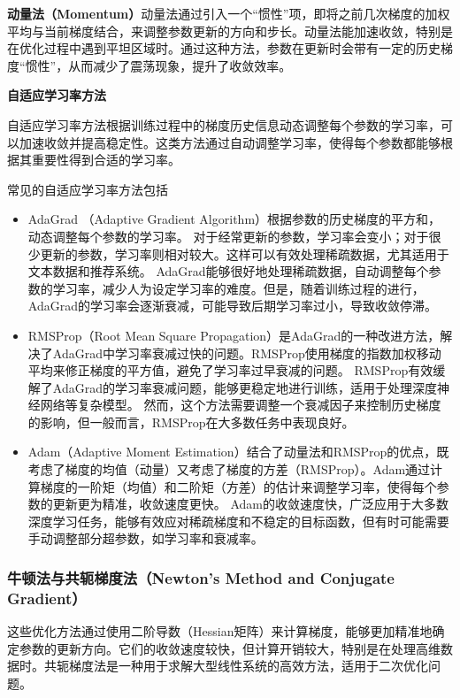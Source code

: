 {\bf 动量法（Momentum）}动量法通过引入一个“惯性”项，即将之前几次梯度的加权平均与当前梯度结合，来调整参数更新的方向和步长。动量法能加速收敛，特别是在优化过程中遇到平坦区域时。通过这种方法，参数在更新时会带有一定的历史梯度“惯性”，从而减少了震荡现象，提升了收敛效率。
 
{\bf 自适应学习率方法}
 
自适应学习率方法根据训练过程中的梯度历史信息动态调整每个参数的学习率，可以加速收敛并提高稳定性。这类方法通过自动调整学习率，使得每个参数都能够根据其重要性得到合适的学习率。

常见的自适应学习率方法包括 
 \begin{itemize} 
\item AdaGrad （Adaptive Gradient Algorithm）根据参数的历史梯度的平方和，动态调整每个参数的学习率。 对于经常更新的参数，学习率会变小；对于很少更新的参数，学习率则相对较大。这样可以有效处理稀疏数据，尤其适用于文本数据和推荐系统。
AdaGrad能够很好地处理稀疏数据，自动调整每个参数的学习率，减少人为设定学习率的难度。但是，随着训练过程的进行，AdaGrad的学习率会逐渐衰减，可能导致后期学习率过小，导致收敛停滞。

\item RMSProp（Root Mean Square Propagation）是AdaGrad的一种改进方法，解决了AdaGrad中学习率衰减过快的问题。RMSProp使用梯度的指数加权移动平均来修正梯度的平方值，避免了学习率过早衰减的问题。
RMSProp有效缓解了AdaGrad的学习率衰减问题，能够更稳定地进行训练，适用于处理深度神经网络等复杂模型。
然而，这个方法需要调整一个衰减因子来控制历史梯度的影响，但一般而言，RMSProp在大多数任务中表现良好。

\item Adam（Adaptive Moment Estimation）结合了动量法和RMSProp的优点，既考虑了梯度的均值（动量）又考虑了梯度的方差（RMSProp）。Adam通过计算梯度的一阶矩（均值）和二阶矩（方差）的估计来调整学习率，使得每个参数的更新更为精准，收敛速度更快。  Adam的收敛速度快，广泛应用于大多数深度学习任务，能够有效应对稀疏梯度和不稳定的目标函数，但有时可能需要手动调整部分超参数，如学习率和衰减率。 
\end{itemize}
  
 \subsubsection*{牛顿法与共轭梯度法（Newton's Method and Conjugate Gradient）} 这些优化方法通过使用二阶导数（Hessian矩阵）来计算梯度，能够更加精准地确定参数的更新方向。它们的收敛速度较快，但计算开销较大，特别是在处理高维数据时。共轭梯度法是一种用于求解大型线性系统的高效方法，适用于二次优化问题。  

